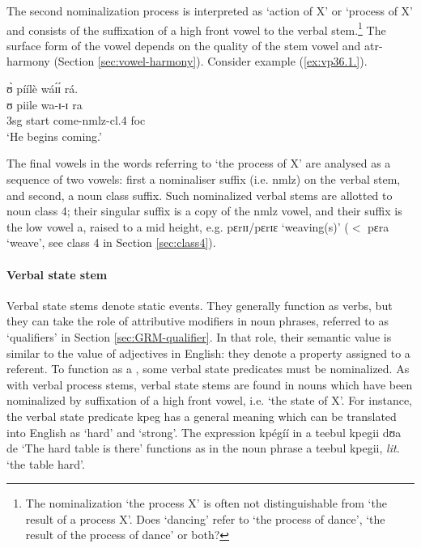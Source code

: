 \begin{exe}
\begin{exe}
\begin{exe}
\begin{exe}
\begin{exe}
\begin{exe}
The second nominalization process is  interpreted as `action of X' or `process of X' and consists of the suffixation of a  high front vowel to the verbal stem.\footnote{The nominalization `the process X' is often not distinguishable from `the result of a process X'.  Does `dancing'  refer to `the process of dance', `the result of the process of dance' or both?} The surface form of the vowel depends on the quality of the stem vowel and {\sc atr}-harmony  (Section \ref{sec:vowel-harmony}). Consider example (\ref{ex:vp36.1.}).

\ea\label{ex:vp36.1.}
\glll ʊ̀ píílè wáɪ́ɪ́ rá.\\
ʊ piile wa-ɪ-ɪ ra\\
  {\sc 3sg} start come-{\sc nmlz}-{\sc cl.4} {\sc foc}\\
\glt  `He begins coming.' 
\z

 The final vowels in the words referring to `the process of X' are analysed as a sequence of two vowels: first a nominaliser suffix (i.e. {\sc nmlz})  on the verbal stem,  and second,  a noun class suffix.  Such nominalized verbal stems are allotted to noun class 4;  their singular suffix is a copy of the {\sc nmlz} vowel, and their   suffix is the low vowel {\sls a}, raised to a mid height, e.g. {\sls pɛrɪɪ}/{\sls pɛrɪɛ} `weaving(s)'  ($<$ {\sls pɛra} `weave', see class 4 in Section \ref{sec:class4}).



\paragraph{Verbal state stem}
\label{sec:GRM-verb-state-stem}

Verbal state stems  denote static events. They generally function  as verbs, but they can take the role of attributive modifiers in noun phrases, referred to as  `qualifiers' in Section \ref{sec:GRM-qualifier}. In that role, their semantic value is similar to the value of adjectives in English: they denote a property  assigned to a referent.  To function as  a , some verbal state predicates must be nominalized. As with verbal process stems,  verbal state stems are found in nouns which have been nominalized by suffixation of a  high front vowel, i.e. `the state of X'. For instance, the verbal state predicate {\sls kpeg} has a general meaning which can be translated into English as `hard' and `strong'. The expression {\sls kpégíí} in {\sls a teebul kpegii dʊa de} `The hard table is there' functions as  in the noun phrase {\sls a teebul kpegii}, {\it lit.} `the table hard'. 



\end{exe}
\end{exe}
\end{exe}
\end{exe}
\end{exe}
\end{exe}
